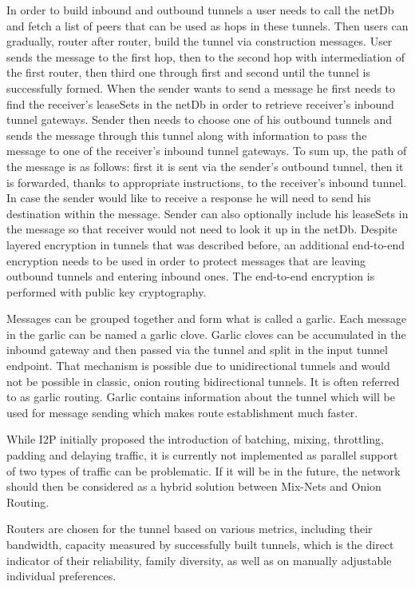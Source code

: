 In order to build inbound and outbound tunnels a user needs to call the netDb and fetch a list of peers that can be used as hops in these tunnels. Then users can gradually, router after router, build the tunnel via construction messages. User sends the message to the first hop, then to the second hop with intermediation of the first router, then third one through first and second until the tunnel is successfully formed.
When the sender wants to send a message he first needs to find the receiver's leaseSets in the netDb in order to retrieve receiver’s inbound tunnel gateways. Sender then needs to choose one of his outbound tunnels and sends the message through this tunnel along with information to pass the message to one of the receiver’s inbound tunnel gateways. To sum up, the path of the message is as follows: first it is sent via the sender's outbound tunnel, then it is forwarded, thanks to appropriate instructions, to the receiver’s inbound tunnel.
In case the sender would like to receive a response he will need to send his destination within the message. Sender can also optionally include his leaseSets in the message so that receiver would not need to look it up in the netDb.
Despite layered encryption in tunnels that was described before, an additional end-to-end encryption needs to be used in order to protect messages that are leaving outbound tunnels and entering inbound ones. The end-to-end encryption is performed with public key cryptography.

Messages can be grouped together and form what is called a garlic. Each message in the garlic can be named a garlic clove. Garlic cloves can be accumulated in the inbound gateway and then passed via the tunnel and split in the input tunnel endpoint. That mechanism is possible due to unidirectional tunnels and would not be possible in classic, onion routing bidirectional tunnels. It is often referred to as garlic routing.
Garlic contains information about the tunnel which will be used for message sending which makes route establishment much faster.

While I2P initially proposed the introduction of batching, mixing, throttling, padding and delaying traffic, it is currently not implemented as parallel support of two types of traffic can be problematic. If it will be in the future, the network should then be considered as a hybrid solution between Mix-Nets and Onion Routing. 

Routers are chosen for the tunnel based on various metrics, including their bandwidth, capacity measured by successfully built tunnels, which is the direct indicator of their reliability, family diversity, as well as on manually adjustable individual preferences.

